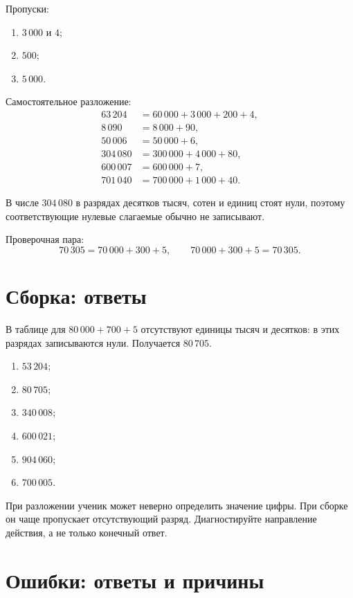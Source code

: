 Пропуски:
\begin{enumerate}
  \item \(3\,000\) и \(4\);
  \item \(500\);
  \item \(5\,000\).
\end{enumerate}

Самостоятельное разложение:
\begin{align*}
  63\,204&=60\,000+3\,000+200+4,\\
  8\,090&=8\,000+90,\\
  50\,006&=50\,000+6,\\
  304\,080&=300\,000+4\,000+80,\\
  600\,007&=600\,000+7,\\
  701\,040&=700\,000+1\,000+40.
\end{align*}

В числе \(304\,080\) в разрядах десятков тысяч, сотен и единиц стоят нули,
поэтому соответствующие нулевые слагаемые обычно не записывают.

Проверочная пара:
\[
  70\,305=70\,000+300+5,
  \qquad
  70\,000+300+5=70\,305.
\]

\section{Сборка: ответы}

В таблице для \(80\,000+700+5\) отсутствуют единицы тысяч и десятков: в этих
разрядах записываются нули. Получается \(80\,705\).

\begin{enumerate}
  \item \(53\,204\);
  \item \(80\,705\);
  \item \(340\,008\);
  \item \(600\,021\);
  \item \(904\,060\);
  \item \(700\,005\).
\end{enumerate}

\begin{teacherbox}
  При разложении ученик может неверно определить значение цифры. При сборке он
  чаще пропускает отсутствующий разряд. Диагностируйте направление действия,
  а не только конечный ответ.
\end{teacherbox}

\section{Ошибки: ответы и причины}

